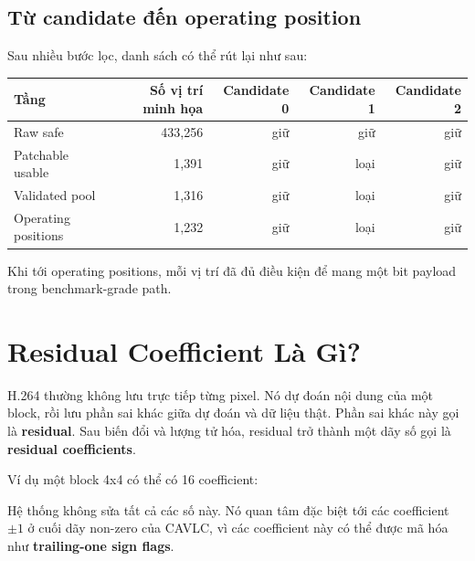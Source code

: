 \documentclass[11pt,a4paper]{article}
\begin{document}
\subsection{Từ candidate đến operating position}

Sau nhiều bước lọc, danh sách có thể rút lại như sau:

\begin{center}
\begin{tabular}{lrrrr}
\toprule
Tầng & Số vị trí minh họa & Candidate 0 & Candidate 1 & Candidate 2 \\
\midrule
Raw safe & 433,256 & giữ & giữ & giữ \\
Patchable usable & 1,391 & giữ & loại & giữ \\
Validated pool & 1,316 & giữ & loại & giữ \\
Operating positions & 1,232 & giữ & loại & giữ \\
\bottomrule
\end{tabular}
\end{center}

Khi tới operating positions, mỗi vị trí đã đủ điều kiện để mang một bit payload
trong benchmark-grade path.

\section{Residual Coefficient Là Gì?}

H.264 thường không lưu trực tiếp từng pixel. Nó dự đoán nội dung của một block,
rồi lưu phần sai khác giữa dự đoán và dữ liệu thật. Phần sai khác này gọi là
\textbf{residual}. Sau biến đổi và lượng tử hóa, residual trở thành một dãy số
gọi là \textbf{residual coefficients}.

Ví dụ một block 4x4 có thể có 16 coefficient:

\begin{center}
\end{center}

Hệ thống không sửa tất cả các số này. Nó quan tâm đặc biệt tới các coefficient
\(\pm1\) ở cuối dãy non-zero của CAVLC, vì các coefficient này có thể được mã
hóa như \textbf{trailing-one sign flags}.
\end{document}
